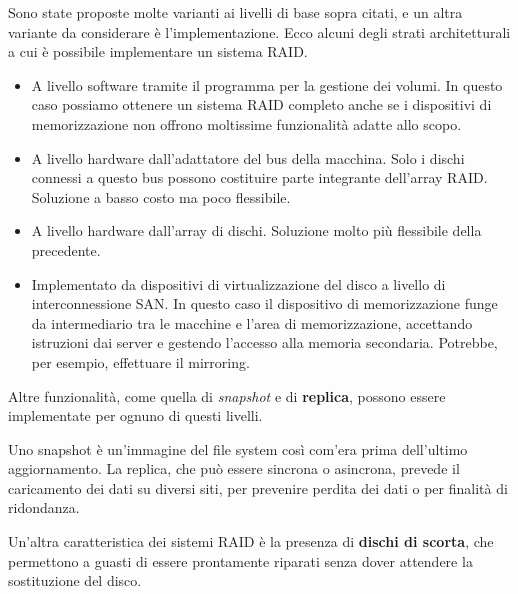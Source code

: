         Sono state proposte molte varianti ai livelli di base sopra citati, e un altra variante da considerare è l'implementazione. Ecco alcuni degli strati architetturali a cui è possibile implementare un sistema RAID.
        \begin{itemize}
            \item A livello software tramite il programma per la gestione dei volumi. In questo caso possiamo ottenere un sistema RAID completo anche se i dispositivi di memorizzazione non offrono moltissime funzionalità adatte allo scopo.
            
            \item A livello hardware dall'adattatore del bus della macchina. Solo i dischi connessi a questo bus possono costituire parte integrante dell'array RAID. Soluzione a basso costo ma poco flessibile.
            
            \item A livello hardware dall'array di dischi. Soluzione molto più flessibile della precedente.
            
            \item Implementato da dispositivi di virtualizzazione del disco a livello di interconnessione SAN. In questo caso il dispositivo di memorizzazione funge da intermediario tra le macchine e l'area di memorizzazione, accettando istruzioni dai server e gestendo l'accesso alla memoria secondaria. Potrebbe, per esempio, effettuare il mirroring.
        \end{itemize}
        
        Altre funzionalità, come quella di \textit{snapshot} e di \textbf{replica}, possono essere implementate per ognuno di questi livelli.
        
        Uno snapshot è un'immagine del file system così com'era prima dell'ultimo aggiornamento. La replica, che può essere sincrona o asincrona, prevede il caricamento dei dati su diversi siti, per prevenire perdita dei dati o per finalità di ridondanza.
        
        Un'altra caratteristica dei sistemi RAID è la presenza di \textbf{dischi di scorta}, che permettono a guasti di essere prontamente riparati senza dover attendere la sostituzione del disco.
